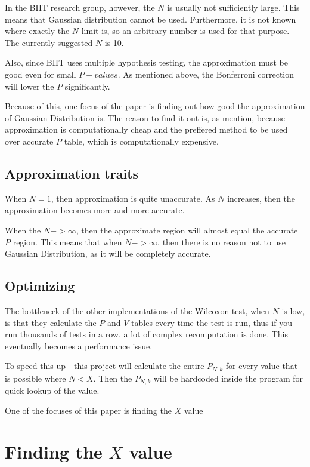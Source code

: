 \documentclass[12pt]{article}
\begin{document}
In the BIIT research group, however, the $N$ is usually not sufficiently large. This means that Gaussian distribution cannot be used. Furthermore, it is not known where exactly the $N$ limit is, so an arbitrary number is used for that purpose. The currently suggested $N$ is 10.

Also, since BIIT uses multiple hypothesis testing, the approximation must be good even for small $P-values$. As mentioned above, the Bonferroni correction will lower the $P$ significantly.

Because of this, one focus of the paper is finding out how good the approximation of Gaussian Distribution is. The reason to find it out is, as mention, because approximation is computationally cheap and the preffered method to be used over accurate $P$ table, which is computationally expensive.

\subsection{Approximation traits}
When $N = 1$, then approximation is quite unaccurate. As $N$ increases, then the approximation becomes more and more accurate.

When the $N->\infty$, then the approximate region will almost equal the accurate $P$ region. This means that when $N->\infty$, then there is no reason not to use Gaussian Distribution, as it will be completely accurate.

\subsection{Optimizing}

The bottleneck of the other implementations of the Wilcoxon test, when $N$ is low, is that they calculate the $P$ and $V$ tables every time the test is run, thus if you run thousands of tests in a row, a lot of complex recomputation is done. This eventually becomes a performance issue.

To speed this up - this project will calculate the entire $P_{N, k}$ for every value that is possible where $N < X$. Then the $P_{N, k}$ will be hardcoded inside the program for quick lookup of the value.

One of the focuses of this paper is finding the $X$ value

\newpage

\section{Finding the $X$ value}
\end{document}
